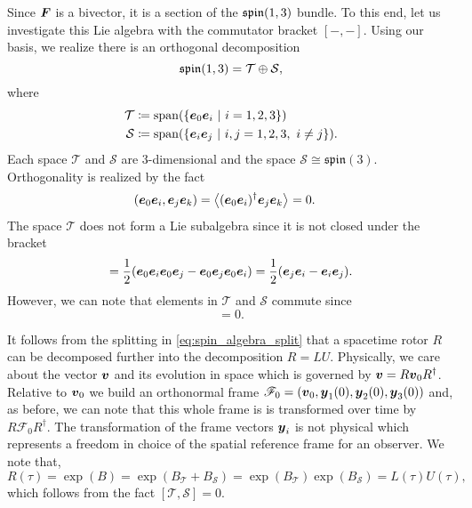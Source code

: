 \documentclass[conf]{new-aiaa}
\begin{document}
Since $\boldsymbol{F}$ is a bivector, it is a section of the $\mathfrak{spin}(1,3)$ bundle. To this end, let us investigate this Lie algebra with the commutator bracket $[-,-]$. Using our basis, we realize there is an orthogonal decomposition 
\begin{equation}
    \label{eq:spin_algebra_split}
    \mathfrak{spin}(1,3) = \mathcal{T} \oplus \mathcal{S},
\end{equation}
where 
\begin{align}
    \mathcal{T} &\coloneqq \mathrm{span}(\{\boldsymbol{e}_0 \boldsymbol{e}_i ~\vert~ i = 1,2,3\})\\
    \mathcal{S} &\coloneqq \mathrm{span}(\{\boldsymbol{e}_i \boldsymbol{e}_j ~\vert~ i,j = 1,2,3, ~ i\neq j\}).
\end{align}
Each space $\mathcal{T}$ and $\mathcal{S}$ are 3-dimensional and the space $\mathcal{S}\cong \mathfrak{spin}(3)$. Orthogonality is realized by the fact
\begin{align}
    (\boldsymbol{e}_0 \boldsymbol{e}_i, \boldsymbol{e}_j \boldsymbol{e}_k) &= \left\langle(\boldsymbol{e}_0 \boldsymbol{e}_i)^\dagger \boldsymbol{e}_j \boldsymbol{e}_k\right\rangle_{} = 0.
\end{align}
The space $\mathcal{T}$ does not form a Lie subalgebra since it is not closed under the bracket
\begin{equation}
    [\blade{e}_0\blade{e}_i,\blade{e}_0 \blade{e}_j] = \frac{1}{2} (\blade{e}_0 \blade{e}_i \blade{e}_0 \blade{e}_j - \blade{e}_0 \blade{e}_j \blade{e}_0 \blade{e}_i) = \frac{1}{2}(\blade{e}_j \blade{e}_i-\blade{e}_i \blade{e}_j).
\end{equation}
However, we can note that elements in $\mathcal{T}$ and $\mathcal{S}$ commute since
\begin{equation}
[\blade{e}_0 \blade{e}_i,\blade{e}_j \blade{e}_k] = 0.
\end{equation}

It follows from the splitting in \cref{eq:spin_algebra_split} that a spacetime rotor $R$ can be decomposed further into the decomposition $R=LU$. Physically, we care about the vector ${\boldsymbol{v}}$ and its evolution in space which is governed by ${\boldsymbol{v}}=R\boldsymbol{v}_0 R^\dagger$. Relative to $\boldsymbol{v}_0$ we build an orthonormal frame $\mathscr{F}_0=(\boldsymbol{v}_0,\boldsymbol{y}_1(0),\boldsymbol{y}_2(0),\boldsymbol{y}_3(0))$ and, as before, we can note that this whole frame is is transformed over time by $R\mathscr{F}_0 R^\dagger$. The transformation of the frame vectors $\boldsymbol{y}_i$ is not physical which represents a freedom in choice of the spatial reference frame for an observer. We note that,
\begin{equation}
    R(\tau) = \exp(B) = \exp(B_\mathcal{T}+B_\mathcal{S})=\exp(B_\mathcal{T})\exp(B_\mathcal{S})=L(\tau)U(\tau),
\end{equation}
which follows from the fact $[\mathcal{T},\mathcal{S}]=0$. 
\end{document}
